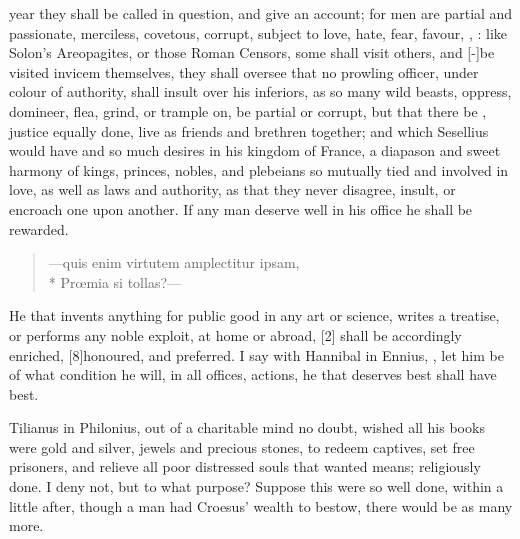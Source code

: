year they shall be called in question, and give an account; for men are
partial and passionate, merciless, covetous, corrupt, subject to love,
hate, fear, favour, \etc{}, : like Solon's
Areopagites, or those Roman Censors, some shall visit others, and
[-\baselineskip]be visited invicem themselves,  they shall oversee that no
prowling officer, under colour of authority, shall insult over his
inferiors, as so many wild beasts, oppress, domineer, flea, grind, or
trample on, be partial or corrupt, but that there be ,
justice equally done, live as friends and brethren together; and which
Sesellius would have and so much desires in his kingdom of France,
a diapason and sweet harmony of kings, princes, nobles, and plebeians
so mutually tied and involved in love, as well as laws and authority,
as that they never disagree, insult, or encroach one upon another. If
any man deserve well in his office he shall be rewarded.
%
\begin{verse}
---\textlatin{quis enim virtutem amplectitur ipsam,}\\*
\textlatin{Pr\oe{}mia si tollas?}---
\end{verse}

He that invents anything for public good in any art or science, writes
a treatise, or performs any noble exploit, at home or abroad,
[2\baselineskip] shall be accordingly enriched, [8\baselineskip]honoured, and preferred. I
say with Hannibal in Ennius, , let him be of what condition he will, in all offices,
actions, he that deserves best shall have best.

Tilianus in Philonius, out of a charitable mind no doubt, wished all
his books were gold and silver, jewels and precious stones, to
redeem captives, set free prisoners, and relieve all poor distressed
souls that wanted means; religiously done. I deny not, but to what
purpose? Suppose this were so well done, within a little after, though
a man had Croesus' wealth to bestow, there would be as many more.

